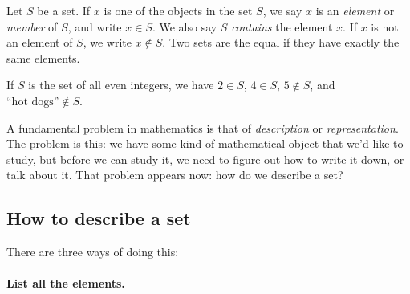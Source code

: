 \documentclass{tufte-book}
\begin{document}
\begin{definition}
  Let $S$ be a set. If $x$ is one of the objects in the set $S$, we say $x$ is an \emph{element} or \emph{member} of $S$, and write $x \in S$. We also say $S$ \emph{contains} the element $x$. If $x$ is not an element of $S$, we write $x \notin S$. Two sets are the equal if they have exactly the same elements.
\end{definition}

If $S$ is the set of all even integers, we have $2 \in S$, $4 \in S$, $5 \notin S$, and $\text{``hot dogs''} \notin S$.

A fundamental problem in mathematics is that of \emph{description} or \emph{representation}. The problem is this: we have some kind of mathematical object that we'd like to study, but before we can study it, we need to figure out how to write it down, or talk about it. That problem appears now: how do we describe a set?

\subsection{How to describe a set}
\label{sec:how-describe-set}

There are three ways of doing this:

\paragraph{List all the elements.}
\label{sec:list-all-elements}
\end{document}
